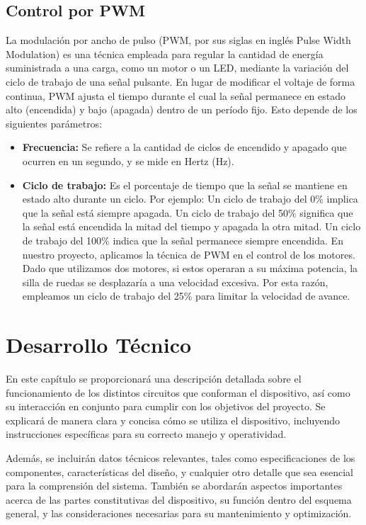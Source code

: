 \documentclass{article}
\begin{document}
\subsection{Control por PWM}
La modulación por ancho de pulso (PWM, por sus siglas en inglés Pulse Width Modulation) es una técnica empleada para regular la cantidad de energía suministrada a una carga, como un motor o un LED, mediante la variación del ciclo de trabajo de una señal pulsante. En lugar de modificar el voltaje de forma continua, PWM ajusta el tiempo durante el cual la señal permanece en estado alto (encendida) y bajo (apagada) dentro de un período fijo. Esto depende de los siguientes parámetros:

\begin{itemize}
    \item \textbf{Frecuencia:} Se refiere a la cantidad de ciclos de encendido y apagado que ocurren en un segundo, y se mide en Hertz (Hz).
    \item \textbf{Ciclo de trabajo:} Es el porcentaje de tiempo que la señal se mantiene en estado alto durante un ciclo. Por ejemplo:
    Un ciclo de trabajo del 0\% implica que la señal está siempre apagada.
    Un ciclo de trabajo del 50\% significa que la señal está encendida la mitad del tiempo y apagada la otra mitad.
    Un ciclo de trabajo del 100\% indica que la señal permanece siempre encendida.
    En nuestro proyecto, aplicamos la técnica de PWM en el control de los motores. Dado que utilizamos dos motores, si estos operaran a su máxima potencia, la silla de ruedas se desplazaría a una velocidad excesiva. Por esta razón, empleamos un ciclo de trabajo del 25\% para limitar la velocidad de avance.
\end{itemize}

\section{Desarrollo Técnico}
En este capítulo se proporcionará una descripción detallada sobre el funcionamiento de los distintos circuitos que conforman el dispositivo, así como su interacción en conjunto para cumplir con los objetivos del proyecto. Se explicará de manera clara y concisa cómo se utiliza el dispositivo, incluyendo instrucciones específicas para su correcto manejo y operatividad.

Además, se incluirán datos técnicos relevantes, tales como especificaciones de los componentes, características del diseño, y cualquier otro detalle que sea esencial para la comprensión del sistema. También se abordarán aspectos importantes acerca de las partes constitutivas del dispositivo, su función dentro del esquema general, y las consideraciones necesarias para su mantenimiento y optimización.
\end{document}
